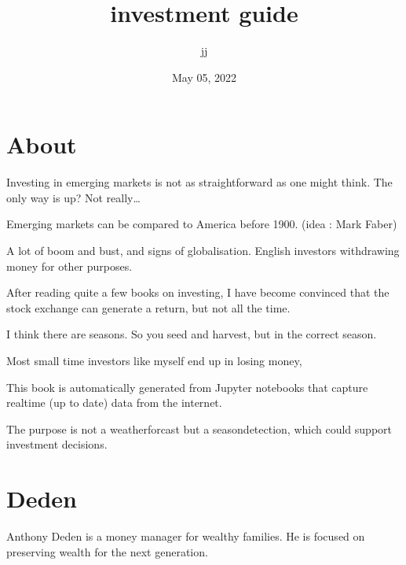 \documentclass[letterpaper,10pt,english]{sphinxmanual}
\title{investment guide}
\date{May 05, 2022}
\author{jj}
\begin{document}
\pagestyle{empty}
\sphinxmaketitle
\pagestyle{plain}
\sphinxtableofcontents
\pagestyle{normal}
\label{\detokenize{index::doc}}


\sphinxstepscope


\chapter{About}
\label{\detokenize{about:about}}\label{\detokenize{about::doc}}
\sphinxAtStartPar
Investing in emerging markets is not as straightforward as one might think.
The only way is up? Not really…

\sphinxAtStartPar
Emerging markets can be compared to America before 1900. (idea : Mark Faber)

\sphinxAtStartPar
A lot of boom and bust, and signs of globalisation.
English investors withdrawing money for other purposes.

\sphinxAtStartPar
After reading quite a few books on investing, I have become convinced that the stock exchange can generate a return, but not all the time.

\sphinxAtStartPar
I think there are seasons. So you seed and harvest, but in the correct season.

\sphinxAtStartPar
Most small time investors like myself end up in losing money,

\sphinxAtStartPar
This book is automatically generated from Jupyter notebooks that capture realtime (up to date) data from the internet.

\sphinxAtStartPar
The purpose is not a weatherforcast but a season\sphinxhyphen{}detection, which could support investment decisions.

\sphinxstepscope


\chapter{Deden}
\label{\detokenize{Deden:deden}}\label{\detokenize{Deden::doc}}
\sphinxAtStartPar
Anthony Deden is a money manager for wealthy families.
He is focused on preserving wealth for the next generation.
\end{document}
